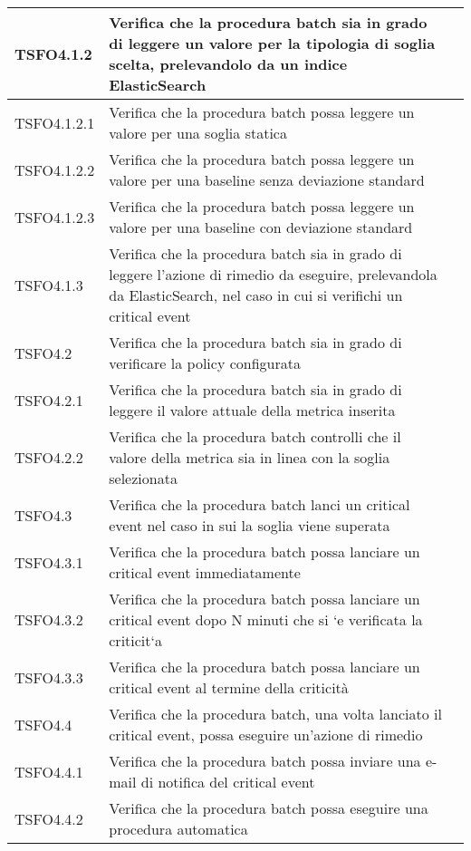 \begin{center}
\begin{longtable}{ | >{\centering\arraybackslash}m{2.5cm} | >{\raggedright\arraybackslash}m{9cm} | >{\centering\arraybackslash}m{3.5cm} | }
				TSFO4.1.2 & Verifica che la procedura batch sia in grado di leggere un valore per la tipologia di soglia scelta,
							prelevandolo da un indice ElasticSearch & \donetext{} \\ \hline
				TSFO4.1.2.1 & Verifica che la procedura batch possa leggere un valore per una soglia statica & \donetext{} \\ \hline
				TSFO4.1.2.2 & Verifica che la procedura batch possa leggere un valore per una baseline senza deviazione standard & \donetext{} \\ \hline
				TSFO4.1.2.3 & Verifica che la procedura batch possa leggere un valore per una baseline con deviazione standard & \donetext{} \\ \hline
				TSFO4.1.3 & Verifica che la procedura batch sia in grado di leggere l'azione di rimedio da eseguire, prelevandola da
							ElasticSearch, nel caso in cui si verifichi un critical event & \donetext{} \\ \hline
				TSFO4.2 & Verifica che la procedura batch sia in grado di verificare la policy configurata & \donetext{} \\ \hline
				TSFO4.2.1 & Verifica che la procedura batch sia in grado di leggere il valore attuale della metrica inserita & \donetext{} \\ \hline
				TSFO4.2.2 & Verifica che la procedura batch controlli che il valore della metrica sia in linea con la soglia selezionata & \donetext{} \\ \hline
				TSFO4.3 & Verifica che la procedura batch lanci un critical event nel caso in sui la soglia viene superata & \donetext{} \\ \hline
				TSFO4.3.1 & Verifica che la procedura batch possa lanciare un critical event immediatamente & \donetext{} \\ \hline
				TSFO4.3.2 & Verifica che la procedura batch possa lanciare un critical event dopo N minuti che si `e veriﬁcata la criticit`a & \donetext{} \\ \hline
				TSFO4.3.3 & Verifica che la procedura batch possa lanciare un critical event al termine della criticità & \donetext{} \\ \hline
				TSFO4.4 & Verifica che la procedura batch, una volta lanciato il critical event, possa eseguire un'azione di rimedio & \donetext{} \\ \hline
				TSFO4.4.1 & Verifica che la procedura batch possa inviare una e-mail di notifica del critical event & \donetext{} \\ \hline
				TSFO4.4.2 & Verifica che la procedura batch possa eseguire una procedura automatica & \donetext{} \\ \hline

\end{longtable}
\end{center}
